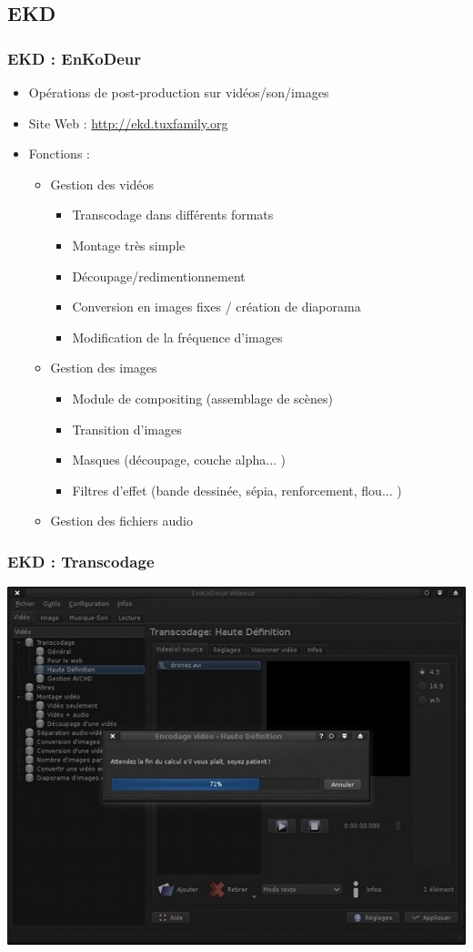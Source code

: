 \subsection{EKD}
\begin{frame}
\frametitle{EKD : EnKoDeur}
\begin{itemize}
\item Opérations de post-production sur vidéos/son/images
\item Site Web : \href{http://ekd.tuxfamily.org}{http://ekd.tuxfamily.org}
\item Fonctions :
\begin{itemize}
\item Gestion des vidéos
\begin{itemize}
\item Transcodage dans différents formats
\item Montage très simple
\item Découpage/redimentionnement
\item Conversion en images fixes / création de diaporama
\item Modification de la fréquence d'images
\end{itemize}
\item Gestion des images
\begin{itemize}
\item Module de compositing (assemblage de scènes)
\item Transition d'images
\item Masques (découpage, couche alpha... )
\item Filtres d'effet (bande dessinée, sépia, renforcement, flou... )
\end{itemize}
\item Gestion des fichiers audio
\end{itemize}
\end{itemize}
\end{frame}


\begin{frame}
\frametitle{EKD : Transcodage}
\includegraphics[scale=0.50]{ressources/ekd_linux_transcode.jpg}
\end{frame}


